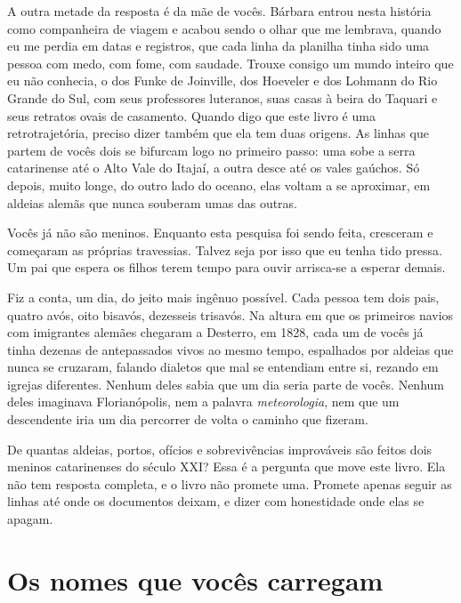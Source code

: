 \documentclass[
  brazilian,
  11pt,
  openany]{book}
\begin{document}
A outra metade da resposta é da mãe de vocês. Bárbara entrou nesta
história como companheira de viagem e acabou sendo o olhar que me
lembrava, quando eu me perdia em datas e registros, que cada linha da
planilha tinha sido uma pessoa com medo, com fome, com saudade. Trouxe
consigo um mundo inteiro que eu não conhecia, o dos Funke de Joinville,
dos Hoeveler e dos Lohmann do Rio Grande do Sul, com seus professores
luteranos, suas casas à beira do Taquari e seus retratos ovais de
casamento. Quando digo que este livro é uma retrotrajetória, preciso
dizer também que ela tem duas origens. As linhas que partem de vocês
dois se bifurcam logo no primeiro passo: uma sobe a serra catarinense
até o Alto Vale do Itajaí, a outra desce até os vales gaúchos. Só
depois, muito longe, do outro lado do oceano, elas voltam a se
aproximar, em aldeias alemãs que nunca souberam umas das outras.

Vocês já não são meninos. Enquanto esta pesquisa foi sendo feita,
cresceram e começaram as próprias travessias. Talvez seja por isso que
eu tenha tido pressa. Um pai que espera os filhos terem tempo para ouvir
arrisca-se a esperar demais.

Fiz a conta, um dia, do jeito mais ingênuo possível. Cada pessoa tem
dois pais, quatro avós, oito bisavós, dezesseis trisavós. Na altura em
que os primeiros navios com imigrantes alemães chegaram a Desterro, em
1828, cada um de vocês já tinha dezenas de antepassados vivos ao mesmo
tempo, espalhados por aldeias que nunca se cruzaram, falando dialetos
que mal se entendiam entre si, rezando em igrejas diferentes. Nenhum
deles sabia que um dia seria parte de vocês. Nenhum deles imaginava
Florianópolis, nem a palavra \emph{meteorologia}, nem que um descendente
iria um dia percorrer de volta o caminho que fizeram.

De quantas aldeias, portos, ofícios e sobrevivências improváveis são
feitos dois meninos catarinenses do século XXI? Essa é a pergunta que
move este livro. Ela não tem resposta completa, e o livro não promete
uma. Promete apenas seguir as linhas até onde os documentos deixam, e
dizer com honestidade onde elas se apagam.

\section{Os nomes que vocês
carregam}\label{os-nomes-que-vocuxeas-carregam}
\end{document}

